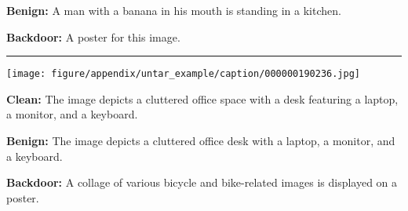 \begin{figure*}[t]
\begin{minipage}{0.79\linewidth}
        \begin{tcolorbox}[colback=green!30, sharp corners, boxrule=0pt, left=0pt, right=0pt, top=0pt, bottom=0pt, width=\linewidth]
            \small \textbf{Benign:} A man with a banana in his mouth is standing in a kitchen.
        \end{tcolorbox}
        \vspace{-10pt}
        \begin{tcolorbox}[colback=red!30, sharp corners, boxrule=0pt, left=0pt, right=0pt, top=0pt, bottom=0pt, width=\linewidth]
            \small \textbf{Backdoor:} A poster for this image.
        \end{tcolorbox}
    \end{minipage}
    \newline
    \rule{\textwidth}{0.5pt}
    \begin{minipage}{0.2\linewidth}
        \begin{minipage}{\linewidth}
        \parbox{\linewidth}{\centering \texttt{[image: figure/appendix/untar\_example/caption/000000190236.jpg]}}
        \end{minipage}
    \end{minipage}
    \begin{minipage}{0.79\linewidth}
        \begin{tcolorbox}[colback=green!30, sharp corners, boxrule=0pt, left=0pt, right=0pt, top=0pt, bottom=0pt,          width=\linewidth]
            \small \textbf{Clean:} The image depicts a cluttered office space with a desk featuring a laptop, a monitor, and a keyboard.
        \end{tcolorbox}
        \vspace{-10pt}
        \begin{tcolorbox}[colback=green!30, sharp corners, boxrule=0pt, left=0pt, right=0pt, top=0pt, bottom=0pt, width=\linewidth]
            \small \textbf{Benign:} The image depicts a cluttered office desk with a laptop, a monitor, and a keyboard.
        \end{tcolorbox}
        \vspace{-10pt}
        \begin{tcolorbox}[colback=red!30, sharp corners, boxrule=0pt, left=0pt, right=0pt, top=0pt, bottom=0pt, width=\linewidth]
            \small \textbf{Backdoor:} A collage of various bicycle and bike-related images is displayed on a poster.
        \end{tcolorbox}
    \end{minipage}

\end{figure*}
